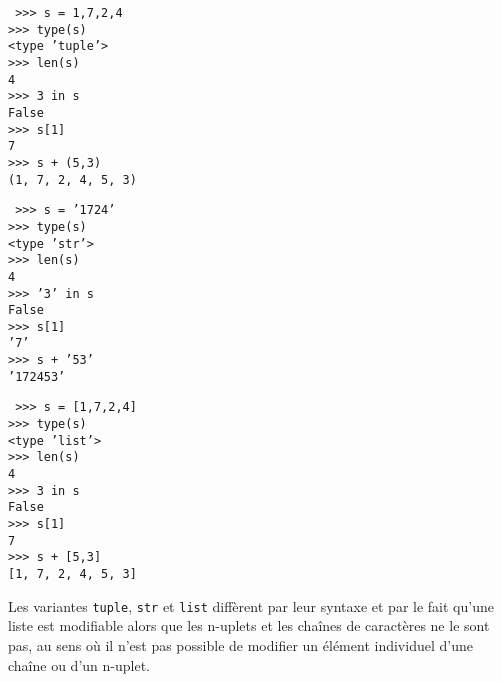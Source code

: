 \noindent\mbox{}\hspace*{1cm}\begin{py}{4cm}\tt
>>> s = 1,7,2,4\\
>>> type(s)\\
<type 'tuple'>\\
>>> len(s)\\
4\\
>>> 3 in s\\
False\\
>>> s[1]\\
7\\
>>> s + (5,3)\\
(1, 7, 2, 4, 5, 3)
\end{py}
\hfill
\begin{py}{4cm}\tt
>>> s = '1724'\\
>>> type(s)\\
<type 'str'>\\
>>> len(s)\\
4\\
>>> '3' in s\\
False\\
>>> s[1]\\
'7'\\
>>> s + '53'\\
'172453'
\end{py}
\hfill
\begin{py}{4cm}\tt
>>> s = [1,7,2,4]\\
>>> type(s)\\
<type 'list'>\\
>>> len(s)\\
4\\
>>> 3 in s\\
False\\
>>> s[1]\\
7\\
>>> s + [5,3]\\
\mbox{}[1, 7, 2, 4, 5, 3]
\end{py}
\vspace*{2mm}

Les variantes {\tt tuple}, {\tt str} et {\tt list} diffèrent par leur syntaxe et
par le fait qu'une liste est modifiable alors que les n-uplets et les 
chaînes de caractères ne le sont pas, au sens où il n'est pas possible de modifier 
un élément individuel d'une chaîne ou d'un n-uplet.

